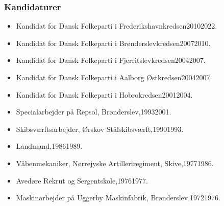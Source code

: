 \documentclass[11pt, a4paper]{awesome-cv}
\begin{document}
\begin{cvletter}
\subsubsection*{Kandidaturer}
\begin{itemize}
\item Kandidat for Dansk Folkeparti i Frederikshavnkredsen20102022.
\item Kandidat for Dansk Folkeparti i Brønderslevkredsen20072010.
\item Kandidat for Dansk Folkeparti i Fjerritslevkredsen20042007.
\item Kandidat for Dansk Folkeparti i Aalborg Østkredsen20042007.
\item Kandidat for Dansk Folkeparti i Hobrokredsen20012004.
\end{itemize}
\begin{itemize}
\item Specialarbejder på Repsol, Brønderslev,19932001.
\item Skibsværftsarbejder, Ørskov Stålskibsværft,19901993.
\item Landmand,19861989.
\item Våbenmekaniker, Nørrejyske Artilleriregiment, Skive,19771986.
\item Avedøre Rekrut og Sergentskole,19761977.
\item Maskinarbejder på Uggerby Maskinfabrik, Brønderslev,19721976.
\end{itemize}
\end{cvletter}
\end{document}
